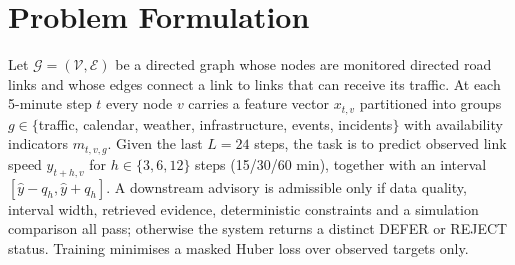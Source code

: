 \section{Problem Formulation}
Let $\mathcal{G}=(\mathcal{V},\mathcal{E})$ be a directed graph whose nodes are monitored directed road links and
whose edges connect a link to links that can receive its traffic. At each 5-minute step $t$ every node $v$ carries a
feature vector $x_{t,v}$ partitioned into groups $g\in\{$traffic, calendar, weather, infrastructure,
events, incidents$\}$ with availability indicators $m_{t,v,g}$. Given the last $L=24$ steps, the task is to predict
observed link speed $y_{t+h,v}$ for $h\in\{3,6,12\}$ steps (15/30/60 min), together with an interval
$[\hat y-q_h,\hat y+q_h]$. A downstream advisory is admissible only if data quality, interval width, retrieved
evidence, deterministic constraints and a simulation comparison all pass; otherwise the system returns a distinct
DEFER or REJECT status. Training minimises a masked Huber loss over observed targets only.
